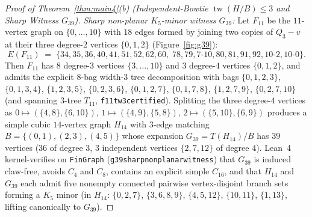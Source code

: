\documentclass[11pt,reqno]{amsart}
\theoremstyle{plain}
\theoremstyle{definition}
\theoremstyle{remark}
\newcommand{\tw}{\operatorname{tw}}
\DeclareRobustCommand{\_}{\ifmmode\text{\textunderscore}\else\textunderscore\allowbreak\fi}
\begin{document}
\begin{proof}[Proof of Theorem~\ref{thm:main4}(b) (Independent-Bowtie $\tw(H/B) \le 3$ and Sharp Witness $G_{39}$)]
\emph{Sharp non-planar $K_5$-minor witness $G_{39}$:} Let $F_{11}$ be the $11$-vertex graph on $\{0, \dots, 10\}$ with $18$ edges formed by joining two copies of $Q_3 - v$ at their three degree-$2$ vertices $\{0, 1, 2\}$ (Figure~\ref{fig:g39}):
\[
  E(F_{11}) \;=\; \{34, 35, 36, 40, 41, 51, 52, 62, 60,\; 78, 79, 7\text{-}10, 80, 81, 91, 92, 10\text{-}2, 10\text{-}0\}.
\]
Then $F_{11}$ has $8$ degree-$3$ vertices $\{3, \dots, 10\}$ and $3$ degree-$4$ vertices $\{0, 1, 2\}$, and admits the explicit $8$-bag width-$3$ tree decomposition with bags $\{0,1,2,3\}$, $\{0,1,3,4\}$, $\{1,2,3,5\}$, $\{0,2,3,6\}$, $\{0,1,2,7\}$, $\{0,1,7,8\}$, $\{1,2,7,9\}$, $\{0,2,7,10\}$ (and spanning $3$-tree $T_{11}$, \texttt{f11\_tw3\_certified}). Splitting the three degree-$4$ vertices as $0 \mapsto (\{4, 8\}, \{6, 10\})$, $1 \mapsto (\{4, 9\}, \{5, 8\})$, $2 \mapsto (\{5, 10\}, \{6, 9\})$ produces a simple cubic $14$-vertex graph $H_{14}$ with $3$-edge matching $B = \{(0, 1), (2, 3), (4, 5)\}$ whose expansion $G_{39} = T(H_{14})/B$ has $39$ vertices ($36$ of degree $3$, $3$ independent vertices $\{2, 7, 12\}$ of degree $4$). Lean~4 kernel-verifies on \texttt{FinGraph} (\texttt{g39\_sharp\_nonplanar\_witness}) that $G_{39}$ is induced claw-free, avoids $C_4$ and $C_8$, contains an explicit simple $C_{16}$, and that $H_{14}$ and $G_{39}$ each admit five nonempty connected pairwise vertex-disjoint branch sets forming a $K_5$ minor (in $H_{14}$: $\{0, 2, 7\}$, $\{3, 6, 8, 9\}$, $\{4, 5, 12\}$, $\{10, 11\}$, $\{1, 13\}$, lifting canonically to $G_{39}$).
\end{proof}
\end{document}
